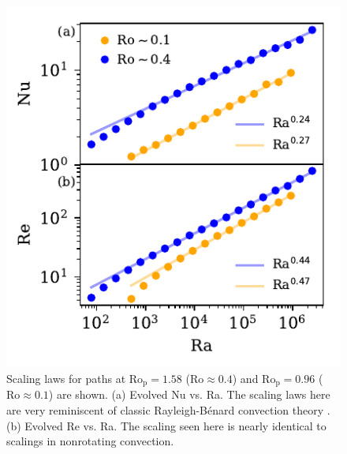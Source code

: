\documentclass[twocolumn, amsmath, amsfonts, amssymb]{aastex62}
\newcommand{\RB}{Rayleigh-B\'{e}nard }
\newcommand{\pro}{\ensuremath{\text{Ro}_{\text{p}}}}
\begin{document}
\begin{figure}[t!]
    \includegraphics{./figs/nu_and_re.pdf}
    \caption{Scaling laws for paths at $\pro = 1.58$ ($\text{Ro} \approx 0.4$) and
    $\pro = 0.96$ ($\text{Ro} \approx 0.1$) are shown. 
    (a) Evolved Nu vs. Ra. The scaling laws here are very reminiscent of classic \RB convection
    theory \citep{ahlers&all2009}.
    (b) Evolved Re vs. Ra.
    The scaling seen here is nearly identical to scalings in nonrotating convection.
    \label{fig:nu_and_re} }
\end{figure}
\end{document}
